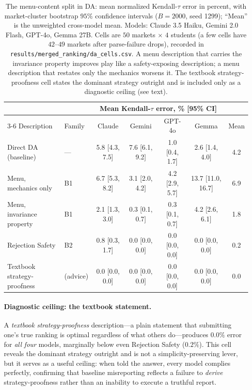 \begin{table}[htbp]
\centering
\footnotesize
\setlength{\tabcolsep}{4pt}
\begin{tabular}{llccccc}
\toprule
& & \multicolumn{4}{c}{Mean Kendall-$\tau$ error, \% [95\% CI]} & \\
\cmidrule(lr){3-6}
Description & Family & Claude & Gemini & GPT-4o & Gemma & Mean \\
\midrule
Direct DA (baseline) & --- & 5.8 [4.3, 7.5] & 7.6 [6.1, 9.2] & 1.0 [0.4, 1.7] & 2.6 [1.4, 4.0] & 4.2 \\
\addlinespace
Menu, mechanics only & B1 & 6.7 [5.3, 8.2] & 3.1 [2.0, 4.2] & 4.2 [2.9, 5.7] & 13.7 [11.0, 16.7] & 6.9 \\
Menu, invariance property & B1 & 2.1 [1.3, 3.0] & 0.3 [0.1, 0.7] & 0.3 [0.1, 0.7] & 4.2 [2.6, 6.1] & 1.8 \\
Rejection Safety & B2 & 0.8 [0.3, 1.7] & 0.0 [0.0, 0.0] & 0.0 [0.0, 0.0] & 0.0 [0.0, 0.0] & 0.2 \\
Textbook strategy-proofness & (advice) & 0.0 [0.0, 0.0] & 0.0 [0.0, 0.0] & 0.0 [0.0, 0.0] & 0.0 [0.0, 0.0] & 0.0 \\
\bottomrule
\end{tabular}
\caption{The menu-content split in DA: mean normalized Kendall-$\tau$ error in percent, with market-cluster bootstrap $95\%$ confidence intervals ($B = 2000$, seed 1299); ``Mean'' is the unweighted cross-model mean. Models: Claude 3.5 Haiku, Gemini 2.0 Flash, GPT-4o, Gemma 27B. Cells are $50$ markets $\times$ $4$ students (a few cells have $42$--$49$ markets after parse-failure drops), recorded in \texttt{results/merged\_ranking/da\_cells.csv}. A menu description that carries the invariance property improves play like a safety-exposing description; a menu description that restates only the mechanics worsens it. The textbook strategy-proofness cell states the dominant strategy outright and is included only as a diagnostic ceiling (see text).}
\label{tab:da-descriptions}
\end{table}

\paragraph{Diagnostic ceiling: the textbook statement.} A \emph{textbook strategy-proofness} description---a plain statement that submitting one's true ranking is optimal regardless of what others do---produces $0.0\%$ error for \emph{all four} models, marginally below even Rejection Safety ($0.2\%$). This cell reveals the dominant strategy outright and is not a simplicity-preserving lever, but it serves as a useful ceiling: when told the answer, every model complies perfectly, confirming that baseline misreporting reflects a failure to \emph{derive} strategy-proofness rather than an inability to execute a truthful report.

